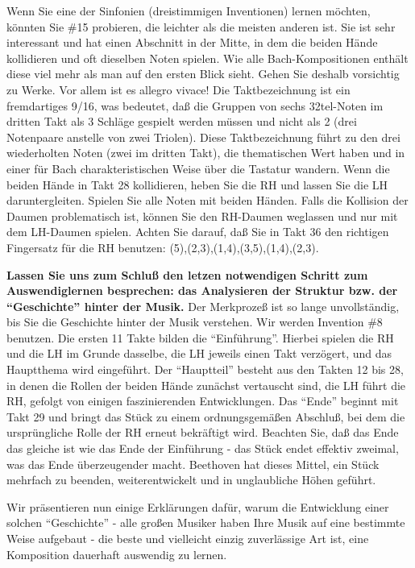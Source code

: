 Wenn Sie eine der Sinfonien (dreistimmigen Inventionen) lernen möchten, könnten Sie \#15 probieren, die leichter als die meisten anderen ist.
Sie ist sehr interessant und hat einen Abschnitt in der Mitte, in dem die beiden Hände kollidieren und oft dieselben Noten spielen.
Wie alle Bach-Kompositionen enthält diese viel mehr als man auf den ersten Blick sieht.
Gehen Sie deshalb vorsichtig zu Werke.
Vor allem ist es allegro vivace!
Die Taktbezeichnung ist ein fremdartiges 9/16, was bedeutet, daß die Gruppen von sechs 32tel-Noten im dritten Takt als 3 Schläge gespielt werden müssen und nicht als 2 (drei Notenpaare anstelle von zwei Triolen).
Diese Taktbezeichnung führt zu den drei wiederholten Noten (zwei im dritten Takt), die thematischen Wert haben und in einer für Bach charakteristischen Weise über die Tastatur wandern.
Wenn die beiden Hände in Takt 28 kollidieren, heben Sie die RH und lassen Sie die LH daruntergleiten.
Spielen Sie alle Noten mit beiden Händen.
Falls die Kollision der Daumen problematisch ist, können Sie den RH-Daumen weglassen und nur mit dem LH-Daumen spielen.
Achten Sie darauf, daß Sie in Takt 36 den richtigen Fingersatz für die RH benutzen: (5),(2,3),(1,4),(3,5),(1,4),(2,3).

\textbf{Lassen Sie uns zum Schluß den letzen notwendigen Schritt zum Auswendiglernen besprechen: das Analysieren der Struktur bzw. der \enquote{Geschichte} hinter der Musik.}
Der Merkprozeß ist so lange unvollständig, bis Sie die Geschichte hinter der Musik verstehen.
Wir werden Invention \#8 benutzen.
Die ersten 11 Takte bilden die \enquote{Einführung}.
Hierbei spielen die RH und die LH im Grunde dasselbe, die LH jeweils einen Takt verzögert, und das Hauptthema wird eingeführt.
Der \enquote{Hauptteil} besteht aus den Takten 12 bis 28, in denen die Rollen der beiden Hände zunächst vertauscht sind, die LH führt die RH, gefolgt von einigen faszinierenden Entwicklungen.
Das \enquote{Ende} beginnt mit Takt 29 und bringt das Stück zu einem ordnungsgemäßen Abschluß, bei dem die ursprüngliche Rolle der RH erneut bekräftigt wird.
Beachten Sie, daß das Ende das gleiche ist wie das Ende der Einführung - das Stück endet effektiv zweimal, was das Ende überzeugender macht.
Beethoven hat dieses Mittel, ein Stück mehrfach zu beenden, weiterentwickelt und in unglaubliche Höhen geführt.

Wir präsentieren nun einige Erklärungen dafür, warum die Entwicklung einer solchen \enquote{Geschichte} - alle großen Musiker haben Ihre Musik auf eine bestimmte Weise aufgebaut - die beste und vielleicht einzig zuverlässige Art ist, eine Komposition dauerhaft auswendig zu lernen.



